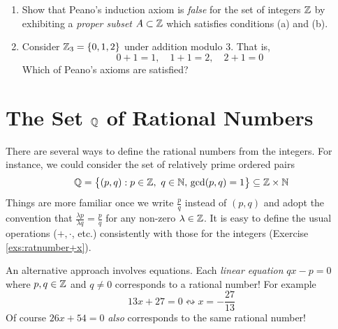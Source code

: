 \begin{exercisessec}{}{}
\begin{enumerate}


  \item Show that Peano's induction axiom is \emph{false} for the set of integers $\mathbb{Z}$  by exhibiting a \emph{proper subset} $A\subset\mathbb{Z}$ which satisfies conditions (a) and (b).
  
  \item Consider $\mathbb{Z}_3=\{0,1,2\}$ under addition modulo 3. That is,
  \[0+1=1,\quad 1+1=2,\quad 2+1=0\]
  Which of Peano's axioms are satisfied?
\end{enumerate}
\end{exercisessec}

\clearpage




\section[The Set Q of Rational Numbers]{The Set $\mathbb{Q}$ of Rational Numbers}\label{sec:Q}

There are several ways to define the rational numbers from the integers. For instance, we could consider the set of relatively prime ordered pairs
\[\Q=\bigl\{(p,q):p\in\Z,\ q\in\N,\, \gcd(p,q)=1\bigr\}\subseteq\Z\times\N\]
Things are more familiar once we write $\frac pq$ instead of $(p,q)$ and adopt the convention that $\frac{\lambda p}{\lambda q}=\frac pq$ for any non-zero $\lambda\in\mathbb{Z}$. It is easy to define the usual operations ($+,\cdot$, etc.) consistently with those for the integers (Exercise \ref{exs:ratnumber+x}).
\smallbreak

An alternative approach involves equations. Each \emph{linear equation} $qx-p=0$ where $p,q\in\mathbb{Z}$ and $q\neq 0$ corresponds to a rational number! For example
\[13x+27=0\leftrightsquigarrow x=-\frac{27}{13}\]
Of course $26x+54=0$ \emph{also} corresponds to the same rational number!
\smallbreak

